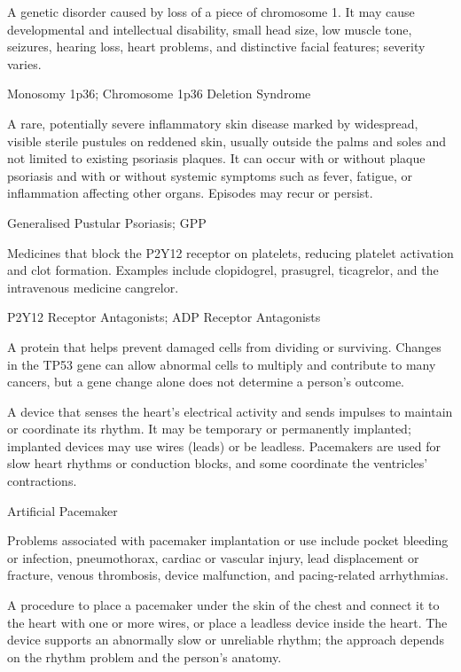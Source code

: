  A genetic disorder caused by loss of a piece of chromosome 1. It may cause developmental and intellectual disability, small head size, low muscle tone, seizures, hearing loss, heart problems, and distinctive facial features; severity varies.

\synonyms
Monosomy 1p36; Chromosome 1p36 Deletion Syndrome

 A rare, potentially severe inflammatory skin disease marked by widespread, visible sterile pustules on reddened skin, usually outside the palms and soles and not limited to existing psoriasis plaques. It can occur with or without plaque psoriasis and with or without systemic symptoms such as fever, fatigue, or inflammation affecting other organs. Episodes may recur or persist.

\synonyms
Generalised Pustular Psoriasis; GPP

 Medicines that block the P2Y12 receptor on platelets, reducing platelet activation and clot formation. Examples include clopidogrel, prasugrel, ticagrelor, and the intravenous medicine cangrelor.

\synonyms
P2Y12 Receptor Antagonists; ADP Receptor Antagonists

 A protein that helps prevent damaged cells from dividing or surviving. Changes in the TP53 gene can allow abnormal cells to multiply and contribute to many cancers, but a gene change alone does not determine a person's outcome.

 A device that senses the heart’s electrical activity and sends impulses to maintain or coordinate its rhythm. It may be temporary or permanently implanted; implanted devices may use wires (leads) or be leadless. Pacemakers are used for slow heart rhythms or conduction blocks, and some coordinate the ventricles’ contractions.

\synonyms
Artificial Pacemaker

 Problems associated with pacemaker implantation or use include pocket bleeding or infection, pneumothorax, cardiac or vascular injury, lead displacement or fracture, venous thrombosis, device malfunction, and pacing-related arrhythmias.

 A procedure to place a pacemaker under the skin of the chest and connect it to the heart with one or more wires, or place a leadless device inside the heart. The device supports an abnormally slow or unreliable rhythm; the approach depends on the rhythm problem and the person's anatomy.

